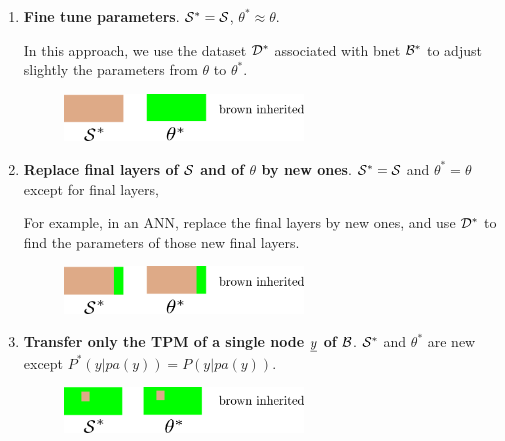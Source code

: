 \begin{enumerate}
\item {\bf Fine tune parameters}.
${\cal S}^*={\cal S}$, $\theta^*\approx \theta$.

In this approach, we use the dataset ${\cal D}^*$ associated 
with bnet ${\cal B}^*$ to 
adjust slightly the parameters from $\theta$
to $\theta^*$.

\begin{figure}[h!]
\centering
\includegraphics[width=2.5in]
{transfer/fine-tune-params.png}
\end{figure}


\item {\bf Replace final layers of ${\cal S}$
and of $\theta$ by new ones}.
${\cal S}^*={\cal S}$ and 
$\theta^*=\theta$ except for final  layers,

For example, in an ANN,
replace the final layers by new ones,
and use ${\cal D}^*$ to 
find the parameters of those
new final layers.

\begin{figure}[h!]
\centering
\includegraphics[width=2.5in]
{transfer/last-layer-new.png}
\end{figure}


\item {\bf Transfer only
the  TPM of a single node ${\underline{y}}$ of ${\cal B}$}.
${\cal S}^*$ and $\theta^*$ are new
except $P^*(y|pa(y))=P(y|pa(y))$.

\begin{figure}[h!]
\centering
\includegraphics[width=2.5in]
{transfer/one-tpm.png}
\end{figure}

\end{enumerate}








